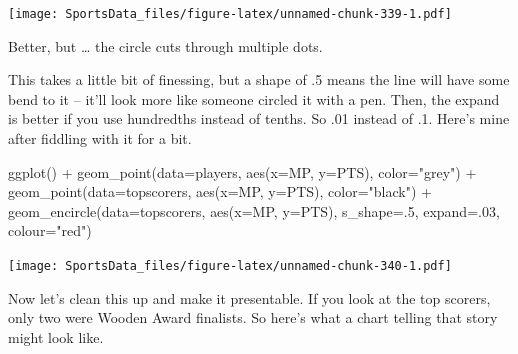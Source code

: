 \documentclass[
]{book}
\newenvironment{Shaded}{\begin{snugshade}}{\end{snugshade}}
\newcommand{\AttributeTok}[1]{\textcolor[rgb]{0.77,0.63,0.00}{#1}}
\newcommand{\DecValTok}[1]{\textcolor[rgb]{0.00,0.00,0.81}{#1}}
\newcommand{\FunctionTok}[1]{\textcolor[rgb]{0.00,0.00,0.00}{#1}}
\newcommand{\NormalTok}[1]{#1}
\newcommand{\SpecialCharTok}[1]{\textcolor[rgb]{0.00,0.00,0.00}{#1}}
\newcommand{\StringTok}[1]{\textcolor[rgb]{0.31,0.60,0.02}{#1}}
\begin{document}
\texttt{[image: SportsData\_files/figure-latex/unnamed-chunk-339-1.pdf]}

Better, but \ldots{} the circle cuts through multiple dots.

This takes a little bit of finessing, but a shape of .5 means the line will have some bend to it -- it'll look more like someone circled it with a pen. Then, the expand is better if you use hundredths instead of tenths. So .01 instead of .1. Here's mine after fiddling with it for a bit.

\begin{Shaded}
\begin{Highlighting}[]
\FunctionTok{ggplot}\NormalTok{() }\SpecialCharTok{+} 
  \FunctionTok{geom\_point}\NormalTok{(}\AttributeTok{data=}\NormalTok{players, }\FunctionTok{aes}\NormalTok{(}\AttributeTok{x=}\NormalTok{MP, }\AttributeTok{y=}\NormalTok{PTS), }\AttributeTok{color=}\StringTok{"grey"}\NormalTok{) }\SpecialCharTok{+} 
  \FunctionTok{geom\_point}\NormalTok{(}\AttributeTok{data=}\NormalTok{topscorers, }\FunctionTok{aes}\NormalTok{(}\AttributeTok{x=}\NormalTok{MP, }\AttributeTok{y=}\NormalTok{PTS), }\AttributeTok{color=}\StringTok{"black"}\NormalTok{) }\SpecialCharTok{+} 
  \FunctionTok{geom\_encircle}\NormalTok{(}\AttributeTok{data=}\NormalTok{topscorers, }\FunctionTok{aes}\NormalTok{(}\AttributeTok{x=}\NormalTok{MP, }\AttributeTok{y=}\NormalTok{PTS), }\AttributeTok{s\_shape=}\NormalTok{.}\DecValTok{5}\NormalTok{, }\AttributeTok{expand=}\NormalTok{.}\DecValTok{03}\NormalTok{, }\AttributeTok{colour=}\StringTok{"red"}\NormalTok{)}
\end{Highlighting}
\end{Shaded}

\texttt{[image: SportsData\_files/figure-latex/unnamed-chunk-340-1.pdf]}

Now let's clean this up and make it presentable. If you look at the top scorers, only two were Wooden Award finalists. So here's what a chart telling that story might look like.
\end{document}
